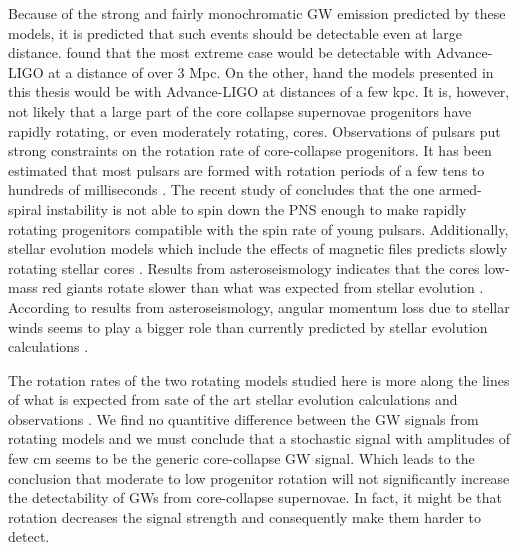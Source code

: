 Because of the strong and fairly monochromatic GW emission predicted by these models,
it is predicted that such events should be detectable even at large distance. \citep{gossan_15} found that the
most extreme case would be detectable with Advance-LIGO at a distance of over 3 Mpc. On the other, hand
the models presented in this thesis would be with Advance-LIGO at distances of a few kpc. 
It is, however, not likely that a large part of the core collapse supernovae progenitors
have rapidly rotating, or even moderately rotating, cores. Observations of pulsars put
strong constraints on the rotation rate of core-collapse progenitors. It has been estimated that
most pulsars are formed with rotation periods of a few tens to hundreds of milliseconds \citep{vranesevic_04,popov_12,noutsos_13}.
The recent study of \cite{kazeroni_17} concludes that
the one armed-spiral instability \citep{ott_05,kuroda_14,takiwaki_16} is not able to spin down the PNS enough to make rapidly rotating progenitors compatible with the spin rate of young
pulsars. Additionally, stellar evolution models which include the effects of magnetic files predicts
slowly rotating stellar cores \citep{heger_05}. Results from asteroseismology \cite{beck_12,mosser_12} indicates
that the cores low-mass red giants rotate slower than what was expected from stellar evolution \citep{cantiello_14,deheuvels_14}.
According to results from asteroseismology, angular momentum loss due to stellar winds seems to play a bigger role than currently predicted by stellar evolution calculations \citep{cantiello_14}. 

The rotation rates of the two rotating models studied here is more along the lines of what 
is expected from sate of the art stellar evolution calculations \citep{heger_05} and observations 
\citep{beck_12,mosser_12,popov_12,noutsos_13,cantiello_14,deheuvels_14}. 
We find no quantitive difference between the GW signals from rotating models and we must conclude that
a stochastic signal with amplitudes of few cm seems to be the generic core-collapse GW signal.
Which leads to the conclusion that moderate to low progenitor rotation will not significantly increase the detectability of 
GWs from core-collapse supernovae. In fact, it might be that rotation decreases the signal strength and consequently make them harder to detect. 

